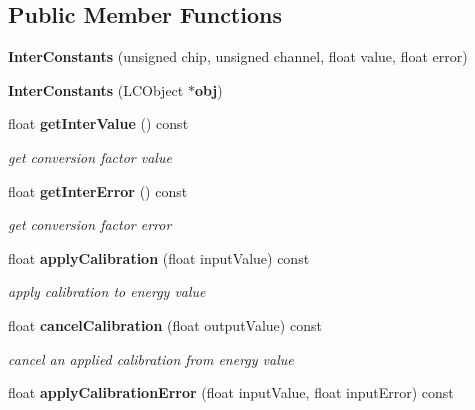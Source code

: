 \subsection*{Public Member Functions}
\begin{DoxyCompactItemize}
\item 
{\bfseries Inter\-Constants} (unsigned chip, unsigned channel, float value, float error)\label{classCALICE_1_1InterConstants_a9130ab502198dc16813f62f591155900}

\item 
{\bfseries Inter\-Constants} (L\-C\-Object $\ast${\bf obj})\label{classCALICE_1_1InterConstants_a8275f0285c5080d4024de5557e0d0709}

\item 
float {\bf get\-Inter\-Value} () const \label{classCALICE_1_1InterConstants_a2da8b23255795109983569198e70bfd7}

\begin{DoxyCompactList}\small\item\em get conversion factor value \end{DoxyCompactList}\item 
float {\bf get\-Inter\-Error} () const \label{classCALICE_1_1InterConstants_a17d72b981677ced2bc941119dcd19b2f}

\begin{DoxyCompactList}\small\item\em get conversion factor error \end{DoxyCompactList}\item 
float {\bf apply\-Calibration} (float input\-Value) const \label{classCALICE_1_1InterConstants_ac4e54f423b0048db8e79b745a53a5209}

\begin{DoxyCompactList}\small\item\em apply calibration to energy value \end{DoxyCompactList}\item 
float {\bf cancel\-Calibration} (float output\-Value) const \label{classCALICE_1_1InterConstants_a2f2d1a18b5136f7e2772d25629b4ccb2}

\begin{DoxyCompactList}\small\item\em cancel an applied calibration from energy value \end{DoxyCompactList}\item 
float {\bf apply\-Calibration\-Error} (float input\-Value, float input\-Error) const \label{classCALICE_1_1InterConstants_ad102c242709f9229f3936d04bb356be7}


\end{DoxyCompactItemize}

